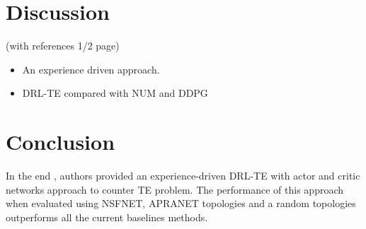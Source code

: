 

\section{Discussion}
\label{sec:orgheadline1}

(with references 1/2 page)
\begin{itemize}
\item An experience driven approach.
\item DRL-TE compared with NUM and DDPG
\end{itemize}

\section{Conclusion}
\label{sec:concl}

In the end , authors provided an experience-driven DRL-TE with actor and critic networks approach to counter TE problem.
The performance of this approach when evaluated using NSFNET, APRANET topologies and a random topologies outperforms all the current baselines methods.